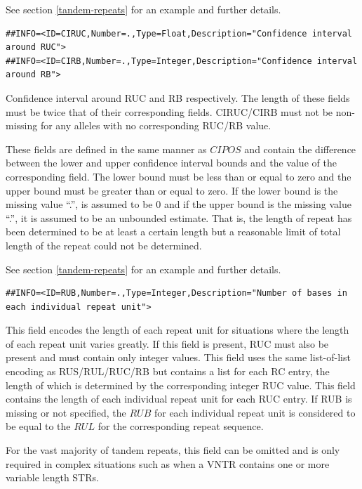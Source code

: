 \documentclass[8pt]{article}
\begin{document}
See section \ref{tandem-repeats} for an example and further details.

\footnotesize
\begin{verbatim}
##INFO=<ID=CIRUC,Number=.,Type=Float,Description="Confidence interval around RUC">
##INFO=<ID=CIRB,Number=.,Type=Integer,Description="Confidence interval around RB">

\end{verbatim}
\normalsize

Confidence interval around RUC and RB respectively.
The length of these fields must be twice that of their corresponding fields.
CIRUC/CIRB must not be non-missing for any alleles with no corresponding RUC/RB value.

These fields are defined in the same manner as $CIPOS$ and contain the difference between the lower and upper confidence interval bounds and the value of the corresponding field.
The lower bound must be less than or equal to zero and the upper bound must be greater than or equal to zero.
If the lower bound is the missing value ``.'', is assumed to be 0 and if the upper bound is the missing value ``.'', it is assumed to be an unbounded estimate.
That is, the length of repeat has been determined to be at least a certain length but a reasonable limit of total length of the repeat could not be determined.

See section \ref{tandem-repeats} for an example and further details.

\footnotesize
\begin{verbatim}
##INFO=<ID=RUB,Number=.,Type=Integer,Description="Number of bases in each individual repeat unit">
\end{verbatim}
\normalsize

This field encodes the length of each repeat unit for situations where the length of each repeat unit varies greatly.
If this field is present, RUC must also be present and must contain only integer values.
This field uses the same list-of-list encoding as RUS/RUL/RUC/RB but contains a list for each RC entry, the length of which is determined by the corresponding integer RUC value.
This field contains the length of each individual repeat unit for each RUC entry.
If RUB is missing or not specified, the $RUB$ for each individual repeat unit is considered to be equal to the $RUL$ for the corresponding repeat sequence.

For the vast majority of tandem repeats, this field can be omitted and is only required in complex situations such as when a VNTR contains one or more variable length STRs.
\end{document}
